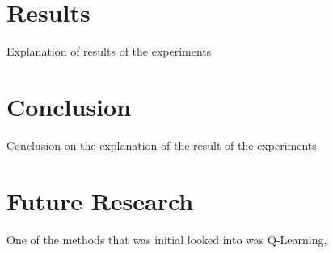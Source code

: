 \documentclass{ba-kecs}
\begin{document}
\section{Results}
Explanation of results of the experiments
\section{Conclusion}
Conclusion on the explanation of the result of the experiments
\section{Future Research}
One of the methods that was initial looked into was Q-Learning, 

\end{document}
